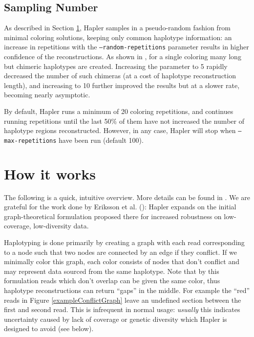 \documentclass[11pt]{llncs}
\begin{document}
\subsection{Sampling Number}

As described in Section \ref{howItWorks}, Hapler samples in a pseudo-random fashion from minimal coloring solutions, keeping only common
haplotype information: an increase in repetitions with the \texttt{--random-repetitions} parameter results in higher confidence of the
reconstructions. As shown in \cite{ONEIL2011}, for a single coloring many long but chimeric haplotypes are created. Increasing the
parameter to 5 rapidly decreased the number of such chimeras (at a cost of haplotype reconstruction length), and increasing to 10 further
improved the results but at a slower rate, becoming nearly asymptotic. 

By default, Hapler runs a minimum of 20 coloring repetitions, and continues running repetitions until the last 50\% of them have not
increased the number of haplotype regions reconstructed. However, in any case, Hapler will stop when \texttt{--max-repetitions} have 
been run (default 100).



 
\newpage

\section{How it works}
\label{howItWorks}

The following is a quick, intuitive overview. More details can be found in \cite{ONEIL2011}. We are grateful for the work done by Eriksson et al. 
(\cite{ERIKSSON2008}): Hapler expands on the initial graph-theoretical formulation proposed there for increased robustness on low-coverage, low-diversity
data.

Haplotyping is done primarily by creating a graph with each read corresponding to a node such that two nodes are connected by an edge if they conflict. If 
we minimally color this graph, each color consists of nodes that don't conflict and may represent data sourced from the same haplotype. Note that by this 
formulation reads which don't overlap can be given the same color, thus haplotype reconstructions can return ``gaps'' in the middle. For example the
``red'' reads in Figure \ref{exampleConflictGraph} leave an undefined section between the first and second read. This is infrequent in normal usage: 
\emph{usually} this indicates uncertainty caused by lack of coverage or genetic diversity which Hapler is designed to avoid (see below).
\end{document}
